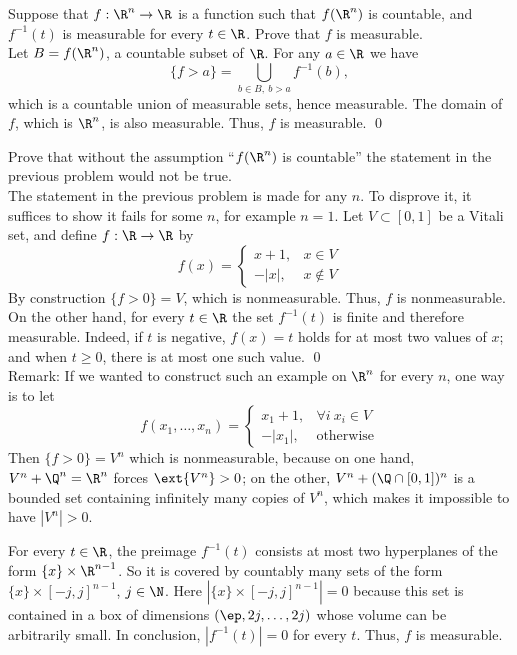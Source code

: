 \begin{hwsol}
Suppose that $f: \R^n \to \R$ is a function such that $f(\R^n)$ is countable, and $f^{-1}(t)$ is measurable for every $t \in \R$. Prove that $f$ is measurable. \\

\pf Let $B = f(\R^n)$, a countable subset of $\R$. For any $a \in \R$ we have
        \[
        \{ f> a \}= \bigcup_{b \in B, \ b>a} f^{-1}(b),
        \]
which is a countable union of measurable sets, hence measurable. The domain of $f$, which is $\R^n$, is also measurable. Thus, $f$ is measurable. \qed \\
\end{hwsol}


\begin{hwsol}
Prove that without the assumption ``$f(\R^n)$ is countable'' the statement in the previous problem would not be true. \\

\pf The statement in the previous problem is made for any $n$. To disprove it, it suffices to show it fails for some $n$, for example $n=1$. Let $V \subset [0, 1]$ be a Vitali set, and define $f: \R \to \R$ by
        \[
        f(x)= 
        \begin{cases} 
        x+1, & x\in V \\ 
        -|x|, & x \notin V
        \end{cases}
        \]
By construction $\{ f> 0 \} = V$, which is nonmeasurable. Thus, $f$ is nonmeasurable. On the other hand, for every $t \in \R$ the set $f^{-1}(t)$ is finite and therefore measurable. Indeed, if $t$ is negative, $f(x)= t$ holds for at most two values of $x$; and when $t\ge 0$, there is at most one such value. \qed \\

\noindent Remark: If we wanted to construct such an example on $\R^n$ for every $n$, one way is to let 
        \[
        f(x_1, \dots, x_n)= 
        \begin{cases} 
        x_1+1, & \forall i\ x_i \in V \\ 
        -|x_1|, & \text{otherwise}
        \end{cases}
        \]
Then $\{ f>0 \}= V^n$ which is nonmeasurable, because on one hand, $V^n + \Q^n = \R^n$ forces $\ext{V^n}> 0$; on the other, $V^n + (\Q \cap [0, 1])^n$ is a bounded set containing infinitely many copies of $V^n$, which makes it impossible to have $|V^n|> 0$.  

For every $t \in \R$, the preimage $f^{-1}(t)$ consists at most two hyperplanes of the form $\{ x \} \times \R^{n-1}$. So it is covered by countably many sets of the form $\{ x \} \times [-j, j]^{n-1}$, $j \in \N$. Here $|\{ x \} \times [-j, j]^{n-1}|= 0$ because this set is contained in a box of dimensions $(\ep, 2j, \ldots, 2j)$ whose volume can be arbitrarily small. In conclusion, $|f^{-1}(t)|= 0$ for every $t$. Thus, $f$ is measurable. \\
\end{hwsol}


